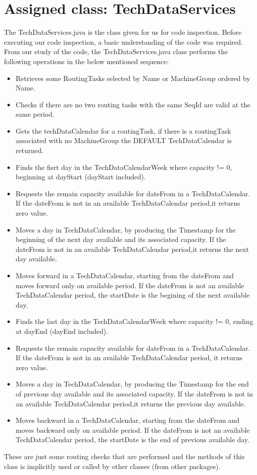 \section{Assigned class: TechDataServices}
The TechDataServices.java is the class given for us for code inspection. Before executing our code inspection, a basic understanding of the code
was required. From our study of the code, the TechDataServices.java class performs the following operations in the below mentioned sequence:
\begin{itemize}
	\item Retrieves some RoutingTasks selected by Name or MachineGroup ordered by Name.
	\item Checks if there are no two routing tasks with the same SeqId are valid at the same period.
	\item Gets the techDataCalendar for a routingTask, if there is a routingTask associated with no MachineGroup the DEFAULT TechDataCalendar is returned.
	\item Finds the fisrt day in the TechDataCalendarWeek where capacity != 0, beginning at dayStart (dayStart included).
	\item Requests the remain capacity available for dateFrom in a TechDataCalendar.
If the dateFrom is not in an available TechDataCalendar period,it returns zero value.
	\item Moves a day in TechDataCalendar, by producing the Timestamp for the beginning of the next day available and its associated capacity.
If the dateFrom is not in an available TechDataCalendar period,it returns the next day available.
	\item Moves forward in a TechDataCalendar, starting from the dateFrom and moves forward only on available period. If the dateFrom is not an available TechDataCalendar period, the startDate is the begining of the next available day.
	\item Finds the last day in the TechDataCalendarWeek where capacity != 0, ending at dayEnd (dayEnd included).
	\item Requests the remain capacity available for dateFrom in a TechDataCalendar. If the dateFrom is not in an available TechDataCalendar period, it returns zero value.
	\item Moves a day in TechDataCalendar, by producing the Timestamp for the end of previous day available and its associated capacity.
If the dateFrom is not in an available TechDataCalendar period,it returns the previous day available.
	\item Moves backward in a TechDataCalendar, starting from the dateFrom and moves backward only on available period. If the dateFrom is not an available TechDataCalendar period, the startDate is the end of previous available day.
\end{itemize}

These are just some routing checks that are performed and the methods of this class is implicitly used or called by other classes (from other packages).